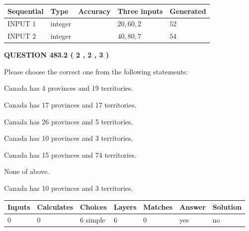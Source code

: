 \documentclass[12pt]{article}
\begin{document}
   
  
  
\noindent\begin{tabular}{|l|l|l|l|l|}
\hline
 Sequential & Type & Accuracy & Three inputs & Generated \\ 
\hline
 
 
  INPUT $  1 $ & integer &  & $
 20
 , 
 60
 , 
 2
 $ & $ 52 $ 
 \\  \hline  
 
 
  INPUT $  2 $ & integer &  & $
 40
 , 
 80
 , 
 7
 $ & $ 54 $ 
 \\  \hline  
 \end{tabular}
   
   
  
\vspace{0.2in}
  
{\textbf{\Large{QUESTION
483.2 
 ( 2 , 2 , 3 )
}}}
  
  
Please choose the correct one from the following statements:
 
 
Canada has   4 provinces and  19 territories.
 
 
Canada has  17 provinces and  17 territories.
 
 
Canada has  26 provinces and  5 territories.
 
 
Canada has 10  provinces and 3 territories.
 
 
Canada has  15 provinces and  74 territories.
 
 
 None of above.
 
 
\noindent{}
 
 
Canada has 10  provinces and 3 territories.
 
 
\noindent{}
 
 
   
   
   
   
\noindent\begin{tabular}{|l|l|l|l|l|l|l|}
 \hline
Inputs & Calculates & Choices & Layers & Matches & Answer & Solution \\ \hline
 0  & 
 0  & 
 6
  simple  
  & 
 6  & 
 0  & 
  yes & 
  no 
  \\ \hline
 \end{tabular}
   
\end{document}
